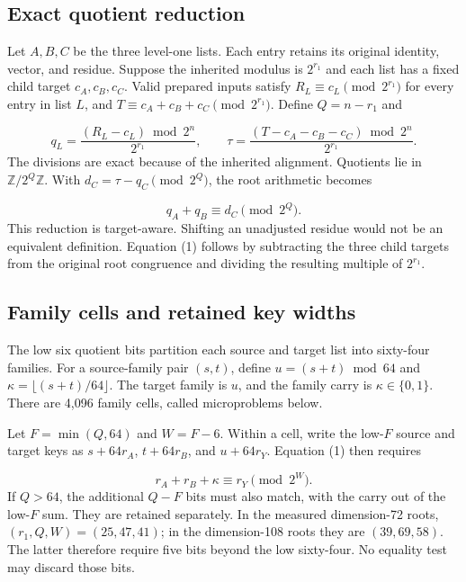 \documentclass[manuscript,screen,review]{acmart}
\begin{document}
\subsection{Exact quotient reduction}
Let $A,B,C$ be the three level-one lists. Each entry retains its original identity, vector, and residue. Suppose the inherited modulus is $2^{r_1}$ and each list has a fixed child target $c_A,c_B,c_C$. Valid prepared inputs satisfy $R_L\equiv c_L\pmod {2^{r_1}}$ for every entry in list $L$, and $T\equiv c_A+c_B+c_C\pmod {2^{r_1}}$. Define $Q=n-r_1$ and

\begin{equation*}
q_L=\frac{(R_L-c_L)\bmod 2^n}{2^{r_1}},\qquad
\tau=\frac{(T-c_A-c_B-c_C)\bmod 2^n}{2^{r_1}}.
\end{equation*}
The divisions are exact because of the inherited alignment. Quotients lie in $\mathbb Z/2^Q\mathbb Z$. With $d_C=\tau-q_C\pmod {2^Q}$, the root arithmetic becomes

\begin{equation*}
q_A+q_B\equiv d_C\pmod {2^Q}. \tag{1}
\end{equation*}
This reduction is target-aware. Shifting an unadjusted residue would not be an equivalent definition. Equation (1) follows by subtracting the three child targets from the original root congruence and dividing the resulting multiple of $2^{r_1}$.

\subsection{Family cells and retained key widths}
The low six quotient bits partition each source and target list into sixty-four families. For a source-family pair $(s,t)$, define $u=(s+t)\bmod 64$ and $\kappa=\lfloor(s+t)/64\rfloor$. The target family is $u$, and the family carry is $\kappa\in\{0,1\}$. There are 4,096 family cells, called microproblems below.

Let $F=\min(Q,64)$ and $W=F-6$. Within a cell, write the low-$F$ source and target keys as $s+64r_A$, $t+64r_B$, and $u+64r_Y$. Equation (1) then requires

\begin{equation*}
r_A+r_B+\kappa\equiv r_Y\pmod {2^W}. \tag{2}
\end{equation*}
If $Q>64$, the additional $Q-F$ bits must also match, with the carry out of the low-$F$ sum. They are retained separately. In the measured dimension-72 roots, $(r_1,Q,W)=(25,47,41)$; in the dimension-108 roots they are $(39,69,58)$. The latter therefore require five bits beyond the low sixty-four. No equality test may discard those bits.
\end{document}
